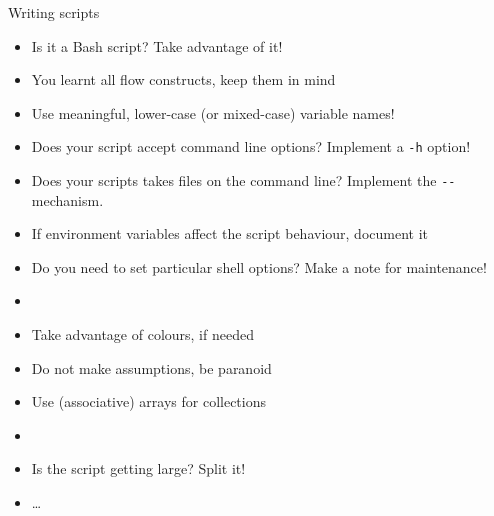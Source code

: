 
\begin{frame}{Writing scripts\hfill{\small{}}}
    \vspace{-2mm}
    \begin{itemize}
        \item Is it a Bash script? Take advantage of it! 
        \item You learnt all flow constructs, keep them in mind
        \item Use meaningful, lower-case (or mixed-case) variable names!
        \item Does your script accept command line options? Implement a \texttt{-h} option!
        \item Does your scripts takes files on the command line? Implement the \texttt{-{}-} mechanism.
        \item If environment variables affect the script behaviour, document it
        \item Do you need to set particular shell options? Make a note for maintenance!
        \item {}
        \item Take advantage of colours, if needed
        \item Do not make assumptions, be paranoid
        \item Use (associative) arrays for collections
        \item {}
        \item Is the script getting large? Split it! 
        \item \ldots
    \end{itemize}
\end{frame}
